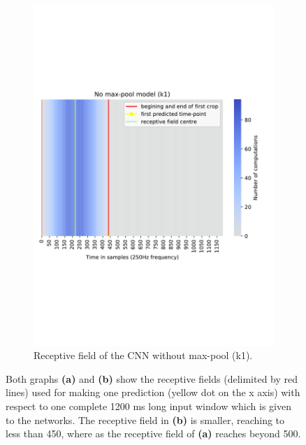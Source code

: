 \begin{figure}[!htpb]
\begin{subfigure}[b]{0.44\textwidth}
   \includegraphics[width=\linewidth]{img/ch3/k1-receptive-field}
   \caption{Receptive field of the CNN without max-pool (k1).}
\end{subfigure}
\caption[Receptive field comparison]{Both graphs \textbf{(a)} and \textbf{(b)} show the receptive fields (delimited by red lines)  used for making one prediction (yellow dot on the x axis) with respect to one complete 1200 ms long input window which is given to the networks.
The receptive field in \textbf{(b)} is smaller, reaching to less than 450, where as the receptive field of \textbf{(a)} reaches beyond 500.}
\label{fig:receptive-field-comparison}
\end{figure}

